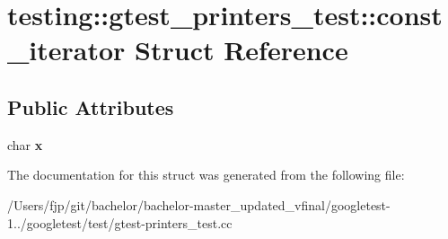 \hypertarget{structtesting_1_1gtest__printers__test_1_1const__iterator}{}\section{testing\+:\+:gtest\+\_\+printers\+\_\+test\+:\+:const\+\_\+iterator Struct Reference}
\label{structtesting_1_1gtest__printers__test_1_1const__iterator}
\subsection*{Public Attributes}
\begin{DoxyCompactItemize}
\item 
\mbox{\label{structtesting_1_1gtest__printers__test_1_1const__iterator_a4412dbc1c37c2bc5211971f0c8176d6b}} 
char {\bfseries x}
\end{DoxyCompactItemize}


The documentation for this struct was generated from the following file\+:\begin{DoxyCompactItemize}
\item 
/\+Users/fjp/git/bachelor/bachelor-\/master\+\_\+updated\+\_\+vfinal/googletest-\/1../googletest/test/gtest-\/printers\+\_\+test.\+cc\end{DoxyCompactItemize}
